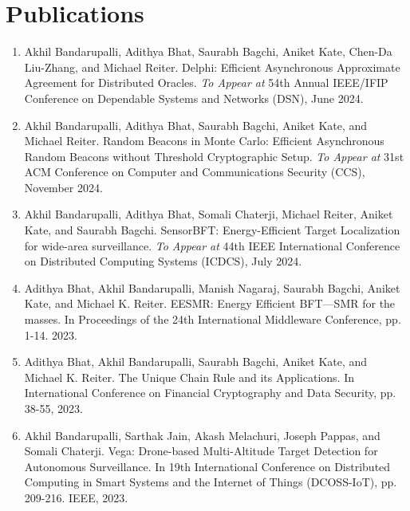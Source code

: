 \documentclass[letterpaper,11pt]{article}
\begin{document}
\section{Publications}
\begin{enumerate}
	\item Akhil Bandarupalli, Adithya Bhat, Saurabh Bagchi, Aniket Kate, Chen-Da Liu-Zhang, and Michael Reiter. Delphi: Efficient Asynchronous Approximate Agreement for Distributed Oracles. \textit{To Appear at} 54th Annual IEEE/IFIP Conference on Dependable Systems and Networks (DSN), June 2024.
	\item Akhil Bandarupalli, Adithya Bhat, Saurabh Bagchi, Aniket Kate, and Michael Reiter. Random Beacons in Monte Carlo: Efficient Asynchronous Random Beacons without Threshold Cryptographic Setup. \textit{To Appear at} 31st ACM Conference on Computer and Communications Security (CCS), November 2024.
	\item Akhil Bandarupalli, Adithya Bhat, Somali Chaterji, Michael Reiter, Aniket Kate, and Saurabh Bagchi. SensorBFT: Energy-Efficient Target Localization for wide-area surveillance. \textit{To Appear at} 44th IEEE International Conference on Distributed Computing Systems (ICDCS), July 2024.
	\item Adithya Bhat, Akhil Bandarupalli, Manish Nagaraj, Saurabh Bagchi, Aniket Kate, and Michael K. Reiter. EESMR: Energy Efficient BFT---SMR for the masses. In Proceedings of the 24th International Middleware Conference, pp. 1-14. 2023.
	\item Adithya Bhat, Akhil Bandarupalli, Saurabh Bagchi, Aniket Kate, and Michael K. Reiter. The Unique Chain Rule and its Applications. In International Conference on Financial Cryptography and Data Security, pp. 38-55, 2023.
	\item Akhil Bandarupalli, Sarthak Jain, Akash Melachuri, Joseph Pappas, and Somali Chaterji. Vega: Drone-based Multi-Altitude Target Detection for Autonomous Surveillance. In 19th International Conference on Distributed Computing in Smart Systems and the Internet of Things (DCOSS-IoT), pp. 209-216. IEEE, 2023. 
\end{enumerate}
\end{document}
